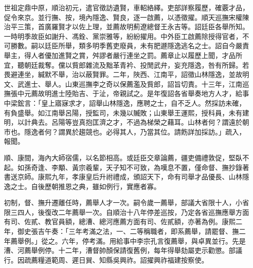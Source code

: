 \begin{pinyinscope}
世祖定鼎中原，順治初元，遣官徵訪遺賢，車軺絡繹。吏部詳察履歷，確覈才品，促令來京。並行撫、按，境內隱逸、賢良，逐一啟薦，以憑徵擢。順天巡撫宋權陳治平三策，首廣羅賢才以佐上理，並薦故明薊遼總督王永吉等。詔廷臣各舉所知。一時明季故臣如謝升、馮銓、黨崇雅等，紛紛擢用。中外臣工啟薦除授得官者，不可勝數。嗣以廷臣所舉，類多明季舊吏廢員，未有肥遯隱逸逃名之士。詔自今嚴責舉主，得人者優加進賢之賞，舛謬者嚴行連坐之罰。薦章止以履歷上聞，才品所宜，聽朝廷裁奪。儻以貲郎雜流及黜革青衿、投閒武弁，妄充隱逸，咎有所歸。若畏避連坐，緘默不舉，治以蔽賢罪。二年，陜西、江南平，詔徵山林隱逸，並故明文、武進士、舉人。山東巡撫李之奇以保薦濫及貲郎，詔旨切責。十三年，江南巡撫張中元薦故明進士陸貽吉、于沚，帝親試之。是年復詔各省舉奏地方人才，給事中梁鋐言：「皇上寤寐求才，詔舉山林隱逸，應聘之士，自不乏人。然採訪未確，有負盛舉。如江南舉呂陽，授監司，未幾以贓敗；山東舉王運熙，授科員，未有建明，以計典去。呂陽等豈真抱匡濟之才，不過為梯榮之藉耳。山林者何？謂遠於朝市也。隱逸者何？謂異於趨競也。必得其人，乃當其位。請飭詳加採訪。」疏入，報聞。

順、康間，海內大師宿儒，以名節相高。或廷臣交章論薦，疆吏備禮敦促，堅臥不起。如孫奇逢、李顒、黃宗羲輩，天子知不可致，為嘆息不置，僅命督、撫抄錄著書送京師。康熙九年，孝康皇后升祔禮成，頒詔天下，命有司舉才品優長、山林隱逸之士。自後歷朝推恩之典，雖如例行，實應者寡。

初制，督、撫升遷離任時，薦舉人才一次。嗣令歲一薦舉，部議大省限十人，小省限三四人，後復改二年薦舉一次。自順治十八年停差巡按，乃定各省巡撫應舉方面有司、佐貳、教官員額，總漕、總河應薦方面有司、佐貳額，亦著為例。康熙二年，御史張吉午奏：「三年考滿之法，一、二等稱職者，即系薦舉，請罷督、撫二年薦舉例。」從之。六年，停考滿。用給事中李宗孔言復薦舉，與卓異並行。先是漕、河薦舉例停。十二年，漕督帥顏保請復舊例，每年得舉劾屬吏示勸懲。部議行。因疏薦糧道範周、遲日巽、知縣吳興祚。詔擢興祚福建按察使。


\end{pinyinscope}
